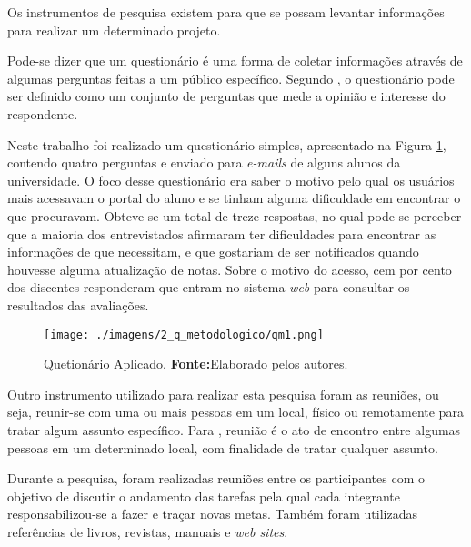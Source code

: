 
	\par Os instrumentos de pesquisa existem para que se possam levantar
informações para realizar um determinado projeto.

	\par Pode-se dizer que um questionário é uma forma de coletar
informações através de algumas perguntas feitas a um público específico.
Segundo , o questionário pode ser definido como
um conjunto de perguntas que mede a opinião e interesse do respondente.

	\par Neste trabalho foi realizado um questionário simples, apresentado na
Figura \ref{fig:qm1}, contendo quatro perguntas e enviado para \textit{e-mails}
de alguns alunos da universidade. O foco desse questionário era saber o motivo
pelo qual os usuários mais acessavam o portal do aluno e se tinham alguma
dificuldade em encontrar o que procuravam. Obteve-se um total de treze
respostas, no qual pode-se perceber que a maioria dos entrevistados afirmaram
ter dificuldades para encontrar as informações de que necessitam, e que
gostariam de ser notificados quando houvesse alguma atualização de notas. Sobre
o motivo do acesso, cem por cento dos discentes responderam que entram no
sistema \textit{web} para consultar os resultados das avaliações.

	\begin{figure}[h!]
		\centerline{\texttt{[image: ./imagens/2\_q\_metodologico/qm1.png]}}
		\caption[Quetionário Aplicado]{Quetionário Aplicado.
			\textbf{Fonte:}Elaborado pelos autores.}
		\label{fig:qm1}
	\end{figure}
	
	
	

	\par Outro instrumento utilizado para realizar esta pesquisa foram as reuniões,
ou seja, reunir-se com uma ou mais pessoas em um local, físico ou remotamente
para tratar algum assunto específico. Para , reunião é o ato de
encontro entre algumas pessoas em um determinado local, com finalidade de tratar
qualquer assunto.

	\par Durante a pesquisa, foram realizadas reuniões entre os participantes com
o objetivo de discutir o andamento das tarefas pela qual cada integrante responsabilizou-se
a fazer e traçar novas metas. Também foram utilizadas referências
de livros, revistas, manuais e \textit{web sites}.

\pagebreak